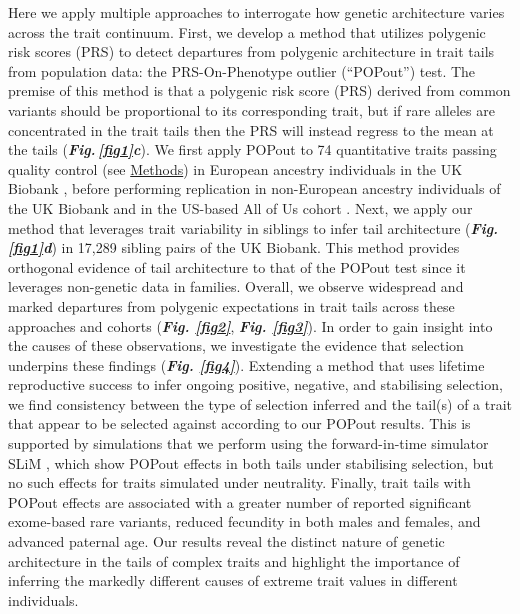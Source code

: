 \documentclass[12pt]{zHenriquesLab-StyleBioRxiv}
\newcommand\fref[1]{\normalsize{\textbf{\textit{Fig. \ref{#1}}}}\normalsize{}}
\newcommand\dref[2]{\normalsize{\textbf{\textit{Fig.\,\ref{#1}#2}}}\normalsize{}}
\begin{document}
Here we apply multiple approaches to interrogate how genetic 
architecture varies across the trait continuum. 
First, we develop a method that utilizes polygenic 
risk scores \cite{Choi2020} (PRS) to detect departures 
from polygenic architecture in trait tails from population 
data: the PRS-On-Phenotype outlier (“POPout”) test.
The premise of this method is that a polygenic risk score (PRS) derived from common variants should be 
proportional to its corresponding trait, but if rare alleles are concentrated in the trait tails then 
the PRS will instead regress to the mean at the tails (\dref{fig1}{c}). We first apply POPout to 74 
quantitative traits passing quality control (see \hyperref[sec:methods]{Methods})
in European ancestry individuals in the 
UK Biobank \cite{Bycroft2018}, before performing replication in non-European ancestry individuals 
of the UK Biobank and in the US-based All of Us cohort \cite{Bick2024}.
Next, we apply our method \cite{Souaiaia2024} that leverages trait variability in siblings to 
infer tail architecture (\dref{fig1}{d}) in 17,289 sibling pairs of the UK Biobank. This method provides 
orthogonal evidence of tail architecture to that of the POPout test since it leverages non-genetic data in families.
Overall, we observe widespread and marked departures from polygenic expectations in trait tails 
across these approaches and cohorts (\fref{fig2}, \fref{fig3}). In order to gain insight into the causes of these observations, 
we investigate the evidence that selection underpins these findings (\fref{fig4}). Extending a 
method \cite{Sanjak2018} that uses lifetime reproductive success to infer ongoing positive, 
negative, and stabilising selection, we find consistency between the type of selection inferred 
and the tail(s) of a trait that appear to be selected against according to our POPout results.
This is supported by simulations that we perform using the forward-in-time 
simulator SLiM \cite{BC_2019}, which show POPout effects in both tails under stabilising selection, 
but no such effects for traits simulated under neutrality. Finally, trait tails with POPout 
effects are associated with a greater number of reported significant exome-based rare variants, 
reduced fecundity in both males and females, and advanced paternal age. Our results reveal the 
distinct nature of genetic architecture in the tails of complex traits and highlight the importance of 
inferring the markedly different causes of extreme trait values in different individuals.
% 
% 
% 
% 
% 
% 
% 
% 
% 
% 
% 
% 
% 
%
% 
% 
% 
% 
% 
% 
% 
% 
% 
% 
% 
% 
% 
% 
% 
% 
% 
% 
% 
\end{document}
